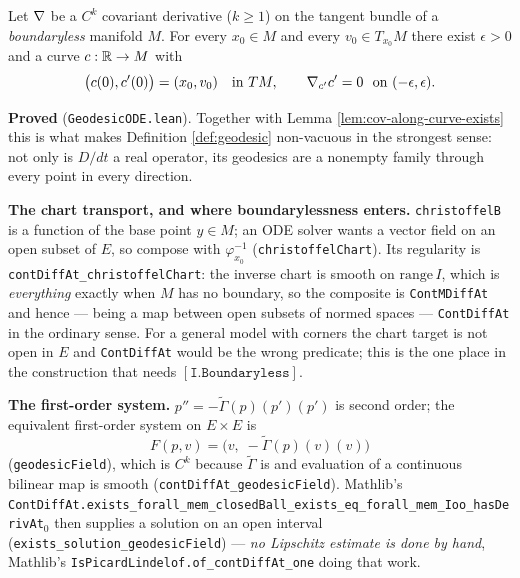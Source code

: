 \begin{lemma}
  \label{lem:geodesic-exists}
  \leanok
  Let $\nabla$ be a $C^k$ covariant derivative ($k \ge 1$) on the tangent bundle of a
  \emph{boundaryless} manifold $M$. For every $x_0 \in M$ and every $v_0 \in T_{x_0}M$ there
  exist $\epsilon > 0$ and a curve $c : \mathbb{R} \to M$ with
  \[
    \bigl(c(0), c'(0)\bigr) = (x_0, v_0) \quad\text{in } TM,
    \qquad \nabla_{c'}c' = 0 \ \text{ on } (-\epsilon,\epsilon).
  \]

  \textbf{Proved} (\texttt{GeodesicODE.lean}). Together with
  Lemma \ref{lem:cov-along-curve-exists} this is what makes Definition \ref{def:geodesic}
  non-vacuous in the strongest sense: not only is $D/dt$ a real operator, its geodesics are a
  nonempty family through every point in every direction.

  \textbf{The chart transport, and where boundarylessness enters.}
  \texttt{christoffelB} is a function of the base point $y \in M$; an ODE solver wants a vector
  field on an open subset of $E$, so compose with $\varphi_{x_0}^{-1}$
  (\texttt{christoffelChart}). Its regularity is
  \texttt{contDiffAt\_christoffelChart}: the inverse chart is smooth on $\mathrm{range}\,I$,
  which is \emph{everything} exactly when $M$ has no boundary, so the composite is
  \texttt{ContMDiffAt} and hence --- being a map between open subsets of normed spaces ---
  \texttt{ContDiffAt} in the ordinary sense. For a general model with corners the chart target
  is not open in $E$ and \texttt{ContDiffAt} would be the wrong predicate; this is the one
  place in the construction that needs $[\texttt{I.Boundaryless}]$.

  \textbf{The first-order system.} $p'' = -\tilde\Gamma(p)(p')(p')$ is second order; the
  equivalent first-order system on $E \times E$ is
  \[
    F(p,v) = \bigl(v,\; -\tilde\Gamma(p)(v)(v)\bigr)
  \]
  (\texttt{geodesicField}), which is $C^k$ because $\tilde\Gamma$ is and evaluation of a
  continuous bilinear map is smooth (\texttt{contDiffAt\_geodesicField}). Mathlib's
  \texttt{ContDiffAt.exists\_forall\_mem\_closedBall\_exists\_eq\_forall\_mem\_Ioo\_hasDerivAt}$_0$
  then supplies a solution on an open interval
  (\texttt{exists\_solution\_geodesicField}) --- \emph{no Lipschitz estimate is done by hand},
  Mathlib's \texttt{IsPicardLindelof.of\_contDiffAt\_one} doing that work.


\end{lemma}
